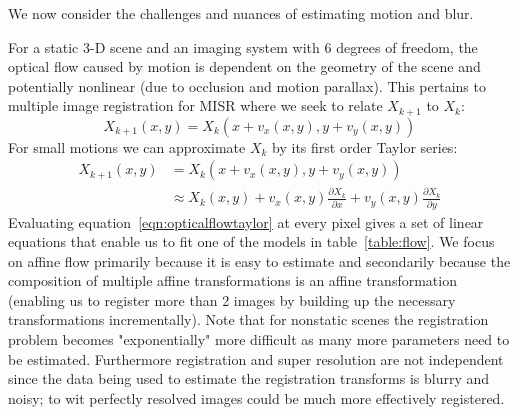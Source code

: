 We now consider the challenges and nuances of estimating motion and blur.

For a static 3-D scene and an imaging system with 6 degrees of freedom, the optical flow caused by motion is dependent on the geometry of the scene and potentially nonlinear (due to occlusion and motion parallax).
%
This pertains to multiple image registration for MISR where we seek to relate $X_{k+1}$ to $X_k$:
\begin{equation*}
    X_{k+1}(x,y) = X_k(x + v_x(x,y), y + v_y(x,y))
\end{equation*}
%
For small motions we can approximate $X_k$ by its first order Taylor series:
\begin{align}
    X_{k+1}(x,y) &= X_k(x + v_x(x,y), y + v_y(x,y)) \\
    &\approx X_k(x,y) + v_x(x,y)\frac{\partial X_k}{\partial x} + v_y(x,y)\frac{\partial X_k}{\partial y}\label{eqn:opticalflowtaylor}
\end{align}
Evaluating equation~\ref{eqn:opticalflowtaylor} at every pixel gives a set of linear equations that enable us to fit one of the models in table~\ref{table:flow}.
%
We focus on affine flow primarily because it is easy to estimate and secondarily because the composition of multiple affine transformations is an affine transformation (enabling us to register more than 2 images by building up the necessary transformations incrementally).
%
Note that for nonstatic scenes the registration problem becomes "exponentially" more difficult as many more parameters need to be estimated.
%
Furthermore registration and super resolution are not independent since the data being used to estimate the registration transforms is blurry and noisy; to wit perfectly resolved images could be much more effectively registered.



